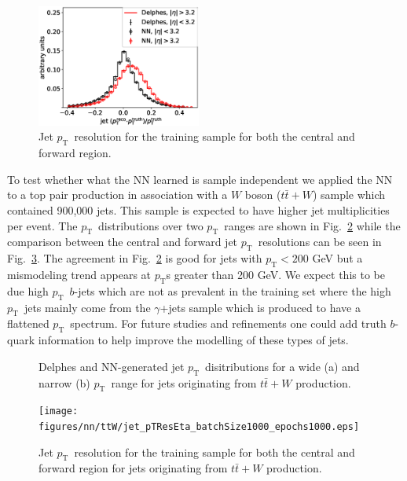 \documentclass[showpacs,showkeys,preprint,prd,nofootinbib,linenumbers,12pt,superscriptaddress]{revtex4-1}
\def\pt{\ensuremath{p_{\mathrm{T}}}}
\begin{document}
\begin{figure}[htb]
  \includegraphics[width=0.48\textwidth]{figures/nn/jet_pTResEta_batchSize1000_epochs1000.eps}
  \caption{Jet \pt\ resolution for the training sample for both the central and forward region. }
  \label{fig:nnRes}
\end{figure}

To test whether what the NN learned is sample independent we applied the NN to a top pair production in association with a $W$ boson ($t\bar{t}+W$) sample which contained 900,000 jets. This sample is expected to have higher jet multiplicities per event. The \pt\ distributions over two \pt\ ranges are shown in Fig.~\ref{fig:pTNNVsDelphes_ttW} while the comparison between the central and forward jet \pt\ resolutions can be seen in Fig.~\ref{fig:nnRes_ttW}. The agreement in Fig.~\ref{fig:pTNNVsDelphes_ttW} is good for jets with $\pt<200$ GeV but a mismodeling trend appears at \pt s greater than 200 GeV. We expect this to be due high \pt\ $b$-jets which are not as prevalent in the training set where the high \pt\ jets mainly come from the $\gamma$+jets sample which is produced to have a flattened \pt\ spectrum. For future studies and refinements one could add truth $b$-quark information to help improve the modelling of these types of jets.  


\begin{figure}[htb]
  \caption{Delphes and NN-generated jet \pt\ disitributions for a wide (a) and narrow (b) \pt\ range for jets originating from $t\bar{t}+W$ production.}
  \label{fig:pTNNVsDelphes_ttW}
\end{figure}


\begin{figure}[htb]
  \texttt{[image: figures/nn/ttW/jet\_pTResEta\_batchSize1000\_epochs1000.eps]}
  \caption{Jet \pt\ resolution for the training sample for both the central and forward region for jets originating from $t\bar{t}+W$ production.}
  \label{fig:nnRes_ttW}
\end{figure}
\end{document}
